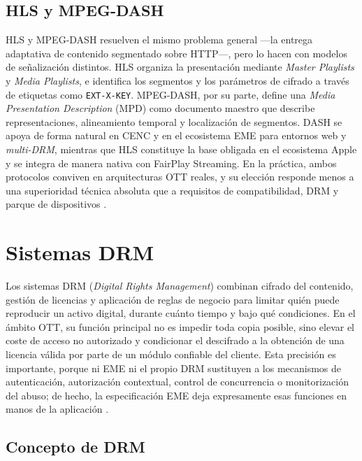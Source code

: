 \subsection{HLS y MPEG-DASH}

HLS y MPEG-DASH resuelven el mismo problema general —la entrega adaptativa de contenido segmentado sobre HTTP—, pero lo hacen con modelos de señalización distintos. HLS organiza la presentación mediante \textit{Master Playlists} y \textit{Media Playlists}, e identifica los segmentos y los parámetros de cifrado a través de etiquetas como \nolinkurl{EXT-X-KEY}. MPEG-DASH, por su parte, define una \textit{Media Presentation Description} (MPD) como documento maestro que describe representaciones, alineamiento temporal y localización de segmentos. DASH se apoya de forma natural en CENC y en el ecosistema EME para entornos web y \textit{multi-DRM}, mientras que HLS constituye la base obligada en el ecosistema Apple y se integra de manera nativa con FairPlay Streaming. En la práctica, ambos protocolos conviven en arquitecturas OTT reales, y su elección responde menos a una superioridad técnica absoluta que a requisitos de compatibilidad, DRM y parque de dispositivos \cite{rfc8216-hls,iso23009dash2022,apple-fps,dashif-about}.

\section{Sistemas DRM}

Los sistemas DRM (\textit{Digital Rights Management}) combinan cifrado del contenido, gestión de licencias y aplicación de reglas de negocio para limitar quién puede reproducir un activo digital, durante cuánto tiempo y bajo qué condiciones. En el ámbito OTT, su función principal no es impedir toda copia posible, sino elevar el coste de acceso no autorizado y condicionar el descifrado a la obtención de una licencia válida por parte de un módulo confiable del cliente. Esta precisión es importante, porque ni EME ni el propio DRM sustituyen a los mecanismos de autenticación, autorización contextual, control de concurrencia o monitorización del abuso; de hecho, la especificación EME deja expresamente esas funciones en manos de la aplicación \cite{w3ceme2026,rafi2023mobiledrm}.

\subsection{Concepto de DRM}

